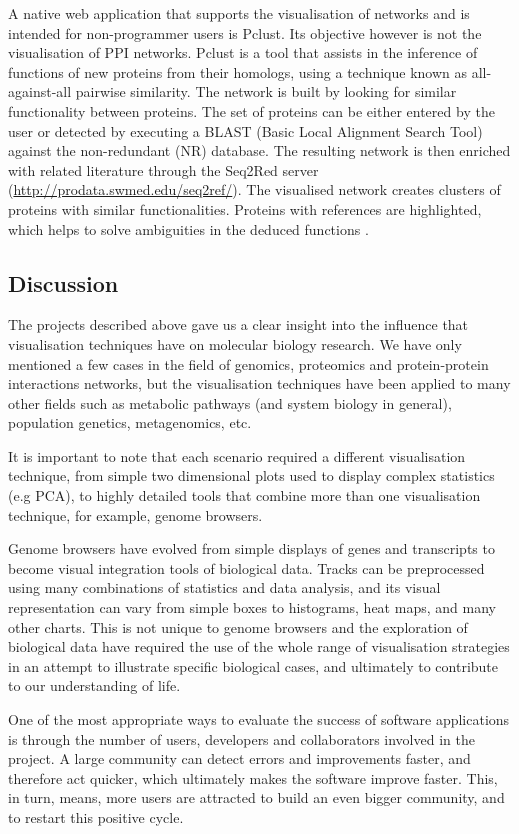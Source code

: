 A native web application that supports the visualisation of networks and is intended for non-programmer users is Pclust. Its objective however is not the visualisation of PPI networks. Pclust is a tool that assists in the inference of functions of new proteins from their homologs, using a technique known as all-against-all pairwise similarity. The network is built by looking for similar functionality between proteins. The set of proteins can be either entered by the user or detected by executing a BLAST (Basic Local Alignment Search Tool) against the non-redundant (NR) database. The resulting network is then enriched with related literature through the Seq2Red server (\url{http://prodata.swmed.edu/seq2ref/}). The visualised network creates clusters of proteins with similar functionalities. Proteins with references are highlighted, which helps to solve ambiguities in the deduced functions \cite{Li2013}.


\subsection{Discussion} \label{sec:intro-discusion}
The projects described above gave us a clear insight into the influence that visualisation techniques have on molecular biology research. We have only mentioned a few cases in the field of genomics, proteomics and protein-protein interactions networks, but the visualisation techniques have been applied to many other fields such as metabolic pathways (and system biology in general), population genetics, metagenomics, etc.

It is important to note that each scenario required a different visualisation technique, from simple two dimensional plots used to display complex statistics (e.g PCA), to highly detailed tools that combine more than one visualisation technique, for example, genome browsers.

Genome browsers have evolved from simple displays of genes and transcripts to become visual integration tools of biological data. Tracks can be preprocessed using many combinations of statistics and data analysis, and its visual representation can vary from simple boxes to histograms, heat maps, and many other charts. This is not unique to genome browsers and the exploration of biological data have required the use of the whole range of visualisation strategies in an attempt to illustrate specific biological cases, and ultimately to contribute to our understanding of life.

One of the most appropriate ways to evaluate the success of software applications is through the number of users, developers and collaborators involved in the project. A large community can detect errors and improvements faster, and therefore act quicker, which ultimately makes the software improve faster. This, in turn, means, more users are attracted to build an even bigger community, and to restart this positive cycle.

